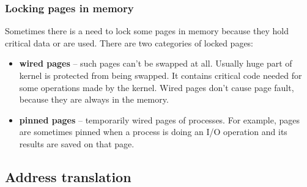 %
\subsubsection{Locking pages in memory}

Sometimes there is a need to lock some pages in memory because they hold critical data or are used.
There are two categories of locked pages:

\begin{itemize}
  \item {\bf wired pages} -- such pages can't be swapped at all. Usually huge part of kernel is protected from being swapped.
    It contains critical code needed for some operations made by the kernel.
    Wired pages don't cause page fault, because they are always in the memory.

  \item {\bf pinned pages} -- temporarily wired pages of processes.
    For example, pages are sometimes pinned when a process is doing an I/O operation and its results are saved on that page.
\end{itemize}


\subsection{Address translation}
\label{section:address_translation}


